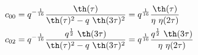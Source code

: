 \begin{equation}
  \begin{split}
    c_{00} &= q^{-{1\over 16}} { \th(\tau) \over \th(\tau)^2 -q~\th(3\tau)^2}
        =q^{{1\over 16}} { \th(\tau) \over \eta ~\eta(2\tau)} \\
    c_{02} &= q^{-{1\over16}} { q^{1\over 2} ~\th(3\tau) \over
        \th(\tau)^2 -q~\th(3\tau)^2} 
        =q^{{1\over 16}} { q^{1\over 2} ~\th(3\tau) \over \eta ~\eta(2\tau)}
  \end{split}
\end{equation}

